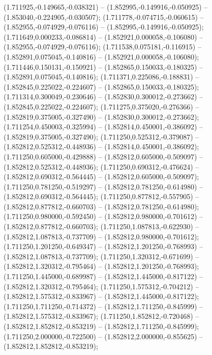  (1.711925,-0.149665,-0.038321) -- (1.852995,-0.149916,-0.050925) -- (1.853040,-0.224905,-0.030507);
 (1.711778,-0.074715,-0.060615) -- (1.852955,-0.074929,-0.076116) -- (1.852995,-0.149916,-0.050925);
 (1.711649,0.000233,-0.086814) -- (1.852921,0.000058,-0.106080) -- (1.852955,-0.074929,-0.076116);
 (1.711538,0.075181,-0.116915) -- (1.852891,0.075045,-0.140816) -- (1.852921,0.000058,-0.106080);
 (1.711446,0.150131,-0.150921) -- (1.852865,0.150033,-0.180325) -- (1.852891,0.075045,-0.140816);
 (1.711371,0.225086,-0.188831) -- (1.852845,0.225022,-0.224607) -- (1.852865,0.150033,-0.180325);
 (1.711314,0.300049,-0.230646) -- (1.852830,0.300012,-0.273662) -- (1.852845,0.225022,-0.224607);
 (1.711275,0.375020,-0.276366) -- (1.852819,0.375005,-0.327490) -- (1.852830,0.300012,-0.273662);
 (1.711254,0.450003,-0.325994) -- (1.852814,0.450001,-0.386092) -- (1.852819,0.375005,-0.327490);
 (1.711250,0.525312,-0.379087) -- (1.852812,0.525312,-0.448936) -- (1.852814,0.450001,-0.386092);
 (1.711250,0.605000,-0.429888) -- (1.852812,0.605000,-0.509097) -- (1.852812,0.525312,-0.448936);
 (1.711250,0.690312,-0.476624) -- (1.852812,0.690312,-0.564445) -- (1.852812,0.605000,-0.509097);
 (1.711250,0.781250,-0.519297) -- (1.852812,0.781250,-0.614980) -- (1.852812,0.690312,-0.564445);
 (1.711250,0.877812,-0.557905) -- (1.852812,0.877812,-0.660703) -- (1.852812,0.781250,-0.614980);
 (1.711250,0.980000,-0.592450) -- (1.852812,0.980000,-0.701612) -- (1.852812,0.877812,-0.660703);
 (1.711250,1.087813,-0.622930) -- (1.852812,1.087813,-0.737709) -- (1.852812,0.980000,-0.701612);
 (1.711250,1.201250,-0.649347) -- (1.852812,1.201250,-0.768993) -- (1.852812,1.087813,-0.737709);
 (1.711250,1.320312,-0.671699) -- (1.852812,1.320312,-0.795464) -- (1.852812,1.201250,-0.768993);
 (1.711250,1.445000,-0.689987) -- (1.852812,1.445000,-0.817122) -- (1.852812,1.320312,-0.795464);
 (1.711250,1.575312,-0.704212) -- (1.852812,1.575312,-0.833967) -- (1.852812,1.445000,-0.817122);
 (1.711250,1.711250,-0.714372) -- (1.852812,1.711250,-0.845999) -- (1.852812,1.575312,-0.833967);
 (1.711250,1.852812,-0.720468) -- (1.852812,1.852812,-0.853219) -- (1.852812,1.711250,-0.845999);
 (1.711250,2.000000,-0.722500) -- (1.852812,2.000000,-0.855625) -- (1.852812,1.852812,-0.853219);
